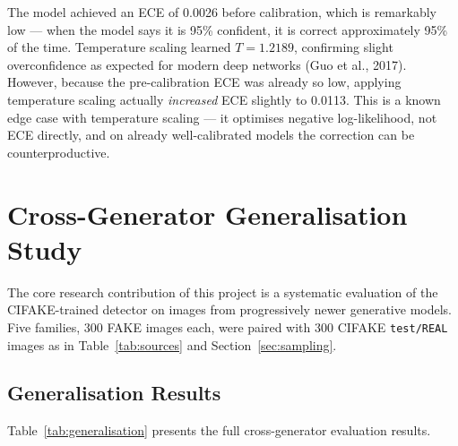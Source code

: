 \documentclass[12pt,a4paper]{article}
\begin{document}
The model achieved an ECE of 0.0026 before calibration, which is remarkably low --- when the model says it is 95\% confident, it is correct approximately 95\% of the time. Temperature scaling learned $T = 1.2189$, confirming slight overconfidence as expected for modern deep networks (Guo et al., 2017). However, because the pre-calibration ECE was already so low, applying temperature scaling actually \emph{increased} ECE slightly to 0.0113. This is a known edge case with temperature scaling --- it optimises negative log-likelihood, not ECE directly, and on already well-calibrated models the correction can be counterproductive.

\section{Cross-Generator Generalisation Study}
\label{sec:generalisation}

The core research contribution of this project is a systematic evaluation of the CIFAKE-trained detector on images from progressively newer generative models. Five families, 300 FAKE images each, were paired with 300 CIFAKE \texttt{test/REAL} images as in Table~\ref{tab:sources} and Section~\ref{sec:sampling}.

\subsection{Generalisation Results}

Table~\ref{tab:generalisation} presents the full cross-generator evaluation results.

\begin{table}[ht]
\centering
\caption{Cross-generator generalisation results.}
\label{tab:generalisation}
\end{table}
\end{document}
